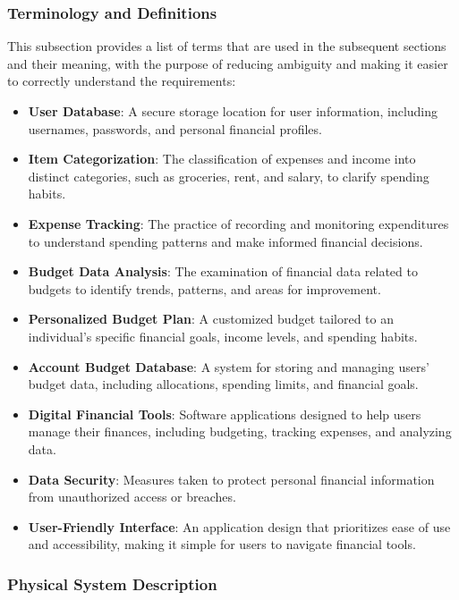\documentclass[12pt]{article}
\begin{document}
\subsubsection{Terminology and  Definitions}

This subsection provides a list of terms that are used in the subsequent
sections and their meaning, with the purpose of reducing ambiguity and making it
easier to correctly understand the requirements:

\begin{itemize}
  \item \textbf{User Database}: A secure storage location for user information,
  including usernames, passwords, and personal financial profiles.
  \item \textbf{Item Categorization}: The classification of expenses and income
  into distinct categories, such as groceries, rent, and salary, to clarify
  spending habits.
  \item \textbf{Expense Tracking}: The practice of recording and monitoring
  expenditures to understand spending patterns and make informed financial
  decisions.
  \item \textbf{Budget Data Analysis}: The examination of financial data related
  to budgets to identify trends, patterns, and areas for improvement.
  \item \textbf{Personalized Budget Plan}: A customized budget tailored to an
  individual's specific financial goals, income levels, and spending habits.
  \item \textbf{Account Budget Database}: A system for storing and managing
  users' budget data, including allocations, spending limits, and financial
  goals.
  \item \textbf{Digital Financial Tools}: Software applications designed to help
  users manage their finances, including budgeting, tracking expenses, and
  analyzing data.
  \item \textbf{Data Security}: Measures taken to protect personal financial
  information from unauthorized access or breaches.
  \item \textbf{User-Friendly Interface}: An application design that prioritizes
  ease of use and accessibility, making it simple for users to navigate
  financial tools.
\end{itemize}



\subsubsection{Physical System Description} \label{sec_phySystDescrip}
\end{document}
